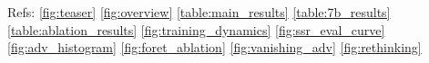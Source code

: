 \documentclass[twocolumn]{article}
\begin{document}









Refs: \ref{fig:teaser} \ref{fig:overview} \ref{table:main_results} \ref{table:7b_results} \ref{table:ablation_results} \ref{fig:training_dynamics} \ref{fig:ssr_eval_curve} \ref{fig:adv_histogram} \ref{fig:foret_ablation} \ref{fig:vanishing_adv} \ref{fig:rethinking}
\clearpage
\end{document}
